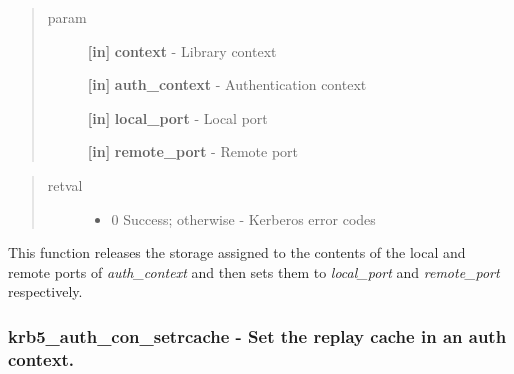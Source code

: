 \documentclass[letterpaper,10pt,english]{sphinxmanual}
\begin{document}
\begin{fulllineitems}
\label{appdev/refs/api/krb5_auth_con_setports:krb5_auth_con_setports}
\end{fulllineitems}

\begin{quote}\begin{description}
\item[{param}] \leavevmode
\textbf{{[}in{]}} \textbf{context} - Library context

\textbf{{[}in{]}} \textbf{auth\_context} - Authentication context

\textbf{{[}in{]}} \textbf{local\_port} - Local port

\textbf{{[}in{]}} \textbf{remote\_port} - Remote port

\end{description}\end{quote}
\begin{quote}\begin{description}
\item[{retval}] \leavevmode\begin{itemize}
\item {} 
0   Success; otherwise - Kerberos error codes

\end{itemize}

\end{description}\end{quote}

This function releases the storage assigned to the contents of the local and remote ports of \emph{auth\_context} and then sets them to \emph{local\_port} and \emph{remote\_port} respectively.




{\hyperref[appdev/refs/api/krb5_auth_con_genaddrs:krb5_auth_con_genaddrs]{}}




\subsubsection{krb5\_auth\_con\_setrcache -  Set the replay cache in an auth context.}
\label{appdev/refs/api/krb5_auth_con_setrcache::doc}\label{appdev/refs/api/krb5_auth_con_setrcache:krb5-auth-con-setrcache-set-the-replay-cache-in-an-auth-context}
\end{document}
